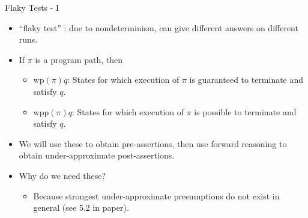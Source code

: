 \documentclass[
  10pt,
  ignorenonframetext,
]{beamer}
\providecommand{\tightlist}{%
  \setlength{\itemsep}{0pt}\setlength{\parskip}{0pt}}
\newcommand{\Wp}{\mathrm{wp}}
\newcommand{\Wpp}{\mathrm{wpp}}
\begin{document}
\begin{frame}{Flaky Tests - I}
\label{flaky-tests---i}
\begin{itemize}
\item
  ``flaky test'' : due to nondeterminism, can give different answers on
  different runs.
\item
  If \(\pi\) is a program path, then

  \begin{itemize}
  \tightlist
  \item
    \(\Wp(\pi)q\): States for which execution of \(\pi\) is guaranteed
    to terminate and satisfy \(q\).
  \item
    \(\Wpp(\pi)q\): States for which execution of \(\pi\) is possible to
    terminate and satisfy \(q\).
  \end{itemize}
\item
  We will use these to obtain pre-assertions, then use forward reasoning
  to obtain under-approximate post-assertions.
\item
  Why do we need these?

  \begin{itemize}
  \tightlist
  \item
    Because strongest under-approximate presumptions do not exist in
    general (see 5.2 in paper).
  \end{itemize}
\end{itemize}
\end{frame}
\end{document}
